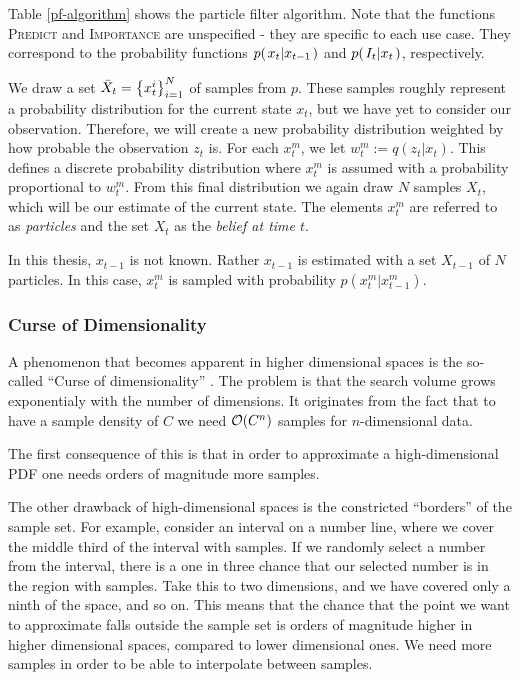 Table \ref{pf-algorithm} shows the particle filter algorithm. Note that the functions \textsc{Predict} and \textsc{Importance} are unspecified - they are specific to each use case. They correspond to the probability functions $p{(\left. x_t \middle\vert x_{t-1} \right.)}$ and $p{(\left. I_t \middle\vert x_t \right.)}$, respectively.

We draw a set $\bar{X}_t = \left\{x_{t}^{i}\right\}_{i=1}^{N}$ of samples from $p$. These samples roughly represent a probability distribution for the current state $x_t$, but we have yet to consider our observation. Therefore, we will create a new probability distribution weighted by how probable the observation $z_t$ is. For each $x_t^m$, we let $w_t^m := q\left(z_t | x_t\right)$. This defines a discrete probability distribution where $x_t^m$ is assumed with a probability proportional to $w_t^m$. From this final distribution we again draw $N$ samples $X_t$, which will be our estimate of the current state. The elements $x_t^m$ are referred to as \emph{particles} and the set $X_t$ as the \emph{belief at time $t$}.

In this thesis, $x_{t-1}$ is not known. Rather $x_{t-1}$ is estimated with a set $X_{t-1}$ of $N$ particles. In this case, $x_t^m$ is sampled with probability $p\left(x_t^m | x_{t-1}^m\right)$.

\subsubsection{Curse of Dimensionality}
A phenomenon that becomes apparent in higher dimensional spaces is the so-called ``Curse of dimensionality'' \cite{EncyclopediaMachineLearning}. The problem is that the search volume grows exponentialy with the number of dimensions. It originates from the fact that to have a sample density of $C$ we need $\mathcal{O}{\left(C^n\right)}$ samples for $n$-dimensional data.

The first consequence of this is that in order to approximate a high-dimensional PDF one needs orders of magnitude more samples.

The other drawback of high-dimensional spaces is the constricted ``borders'' of the sample set. For example, consider an interval on a number line, where we cover the middle third of the interval with samples. If we randomly select a number from the interval, there is a one in three chance that our selected number is in the region with samples. Take this to two dimensions, and we have covered only a ninth of the space, and so on. This means that the chance that the point we want to approximate falls outside the sample set is orders of magnitude higher in higher dimensional spaces, compared to lower dimensional ones. We need more samples in order to be able to interpolate between samples.

